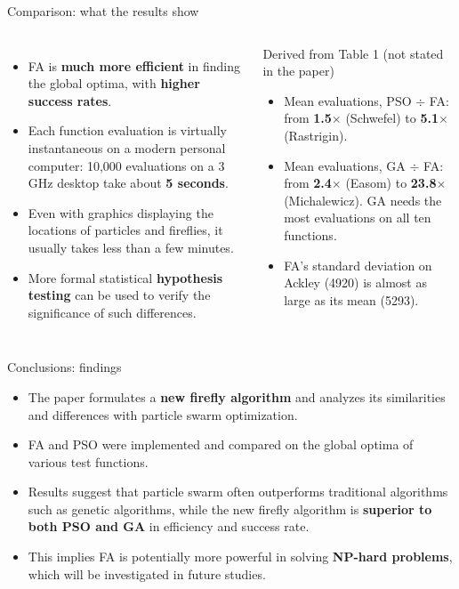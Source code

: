\documentclass[aspectratio=169,11pt]{beamer}
\newcommand{\hdr}[1]{\gdef\curhdr{#1}}
\gdef\curhdr{}
\begin{document}
\begin{frame}[t]{Comparison: what the results show}
\small
\begin{columns}[T]
\begin{itemize}\itemsep0.5em
  \item FA is \textbf{much more efficient} in finding the global optima, with \textbf{higher success rates}.
  \item Each function evaluation is virtually instantaneous on a modern personal computer: 10,000 evaluations on a 3\,GHz desktop take about \textbf{5 seconds}.
  \item Even with graphics displaying the locations of particles and fireflies, it usually takes less than a few minutes.
  \item More formal statistical \textbf{hypothesis testing} can be used to verify the significance of such differences.
\end{itemize}
\begin{block}{Derived from Table 1 (not stated in the paper)}\footnotesize
\begin{itemize}\itemsep0.3em
  \item Mean evaluations, PSO $\div$ FA: from \textbf{1.5$\times$} (Schwefel) to \textbf{5.1$\times$} (Rastrigin).
  \item Mean evaluations, GA $\div$ FA: from \textbf{2.4$\times$} (Easom) to \textbf{23.8$\times$} (Michalewicz). GA needs the most evaluations on all ten functions.
  \item FA's standard deviation on Ackley (4920) is almost as large as its mean (5293).
\end{itemize}
\end{block}
\end{columns}
\end{frame}

\hdr{5 Conclusions}
\begin{frame}[t]{Conclusions: findings}
\begin{itemize}\itemsep0.8em
  \item The paper formulates a \textbf{new firefly algorithm} and analyzes its similarities and differences with particle swarm optimization.
  \item FA and PSO were implemented and compared on the global optima of various test functions.
  \item Results suggest that particle swarm often outperforms traditional algorithms such as genetic algorithms, while the new firefly algorithm is \textbf{superior to both PSO and GA} in efficiency and success rate.
  \item This implies FA is potentially more powerful in solving \textbf{NP-hard problems}, which will be investigated in future studies.
\end{itemize}
\end{frame}
\end{document}
